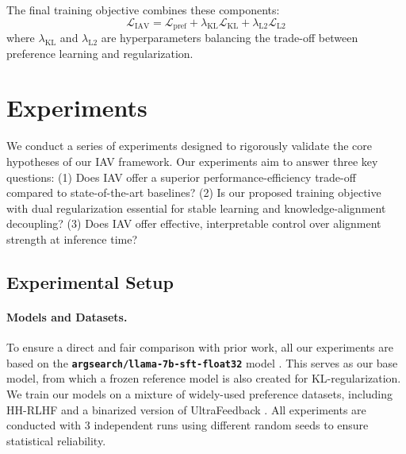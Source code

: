 \documentclass{article}
\begin{document}
The final training objective combines these components:
\begin{equation}
\mathcal{L}_{\text{IAV}} = \mathcal{L}_{\text{pref}} + \lambda_{\text{KL}} \mathcal{L}_{\text{KL}} + \lambda_{\text{L2}} \mathcal{L}_{\text{L2}}
\end{equation}
where $\lambda_{\text{KL}}$ and $\lambda_{\text{L2}}$ are hyperparameters balancing the trade-off between preference learning and regularization.

\section{Experiments}
We conduct a series of experiments designed to rigorously validate the core hypotheses of our IAV framework. Our experiments aim to answer three key questions: (1) Does IAV offer a superior performance-efficiency trade-off compared to state-of-the-art baselines? (2) Is our proposed training objective with dual regularization essential for stable learning and knowledge-alignment decoupling? (3) Does IAV offer effective, interpretable control over alignment strength at inference time?

\subsection{Experimental Setup}

\paragraph{Models and Datasets.}
To ensure a direct and fair comparison with prior work, all our experiments are based on the \textbf{\texttt{argsearch/llama-7b-sft-float32}} model \citep{args2024}. This serves as our base model, from which a frozen reference model is also created for KL-regularization. We train our models on a mixture of widely-used preference datasets, including HH-RLHF \citep{Bai2022} and a binarized version of UltraFeedback \citep{GenARM_ICLR2025}. All experiments are conducted with 3 independent runs using different random seeds to ensure statistical reliability.
\end{document}
